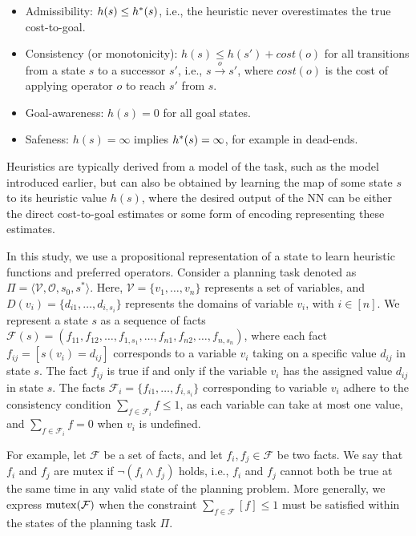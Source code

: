 \documentclass[ppgc,diss,english]{iiufrgs}
\begin{document}
\begin{itemize}
        \item Admissibility: $h(s) \le h^{*}{(s)}$, i.e., the heuristic never overestimates the true cost-to-goal.
        \item Consistency (or monotonicity): $h(s) \le h(s') + cost(o)$ for all transitions from a state $s$ to a successor $s'$, i.e., $s \xrightarrow{o} s'$, where $cost(o)$ is the cost of applying operator $o$ to reach $s'$ from $s$.
        \item Goal-awareness: $h(s) = 0$ for all goal states.
        \item Safeness: $h(s) = \infty$ implies $h^{*} (s) = \infty$, for example in dead-ends.
\end{itemize}

Heuristics are typically derived from a model of the task, such as the \sas model introduced earlier, but can also be obtained by learning the map of some state $s$ to its heuristic value $h(s)$, where the desired output of the NN can be either the direct cost-to-goal estimates or some form of encoding representing these estimates.

In this study, we use a propositional representation of a state to learn heuristic functions and preferred operators. Consider a planning task denoted as $\Pi=\langle\mathcal{V},\mathcal{O},s_0,s^*\rangle$. Here, $\mathcal{V}=\{v_1,\ldots,v_n\}$ represents a set of variables, and $D(v_i)=\{d_{i1},\ldots,d_{i,s_i}\}$ represents the domains of variable $v_i$, with $i\in[n]$. We represent a state $s$ as a sequence of facts
$\mathcal{F}(s)=(f_{11},f_{12},\ldots,f_{1,s_1},\ldots,f_{n1},f_{n2},\ldots,f_{n,s_n})$, where each fact $f_{ij}=[s(v_i)=d_{ij}]$ corresponds to a variable $v_i$ taking on a specific value $d_{ij}$ in state $s$. The fact $f_{ij}$ is true if and only if the variable $v_i$ has the assigned value $d_{ij}$ in state $s$. The facts $\mathcal{F}_i=\{f_{i1},\ldots,f_{i,s_i}\}$ corresponding to variable $v_i$ adhere to the consistency condition $\sum_{f\in \mathcal{F}_i} f\leq 1$, as each variable can take at most one value, and $\sum_{f\in \mathcal{F}_i} f=0$ when $v_i$ is undefined.

For example, let $\mathcal{F}$ be a set of facts, and let $f_i, f_j \in \mathcal{F}$ be two facts. We say that $f_i$ and $f_j$ are mutex if $\neg(f_i \land f_j)$ holds, i.e., $f_i$ and $f_j$ cannot both be true at the same time in any valid state of the planning problem. More generally, we express $\operatorname{mutex}(\mathcal{F})$ when the constraint $\sum_{f\in \mathcal{F}} [f]\leq 1$ must be satisfied within the states of the planning task $\Pi$.
\end{document}
